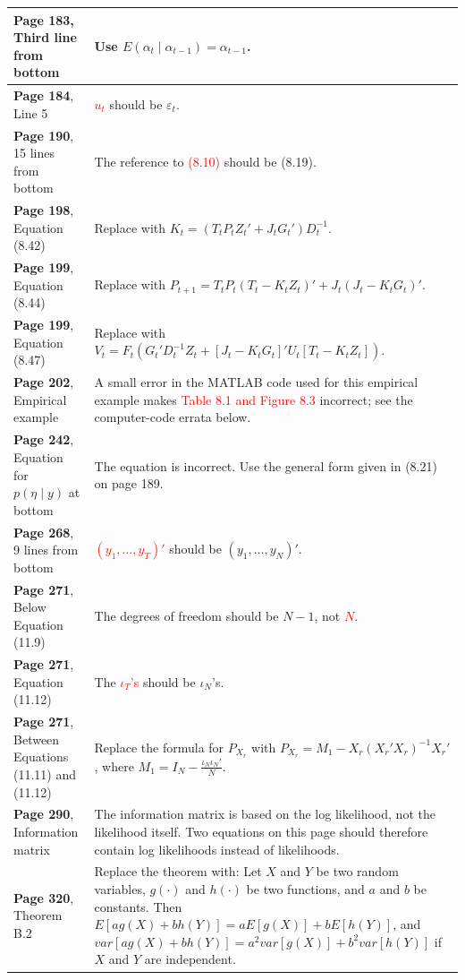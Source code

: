 \documentclass[10pt, a4paper]{article}
\newcommand{\red}[1]{\textcolor{red}{#1}}
\newcommand{\green}[1]{\textcolor{green!50!black}{#1}}
\begin{document}
\begin{longtable}{|R{.36\textwidth}|R{.58\textwidth}|}
	\textbf{Page 183}, Third line from bottom & Use \green{$E(\alpha_t\mid\alpha_{t-1})=\alpha_{t-1}$}. \\ \hline	
	\textbf{Page 184}, Line 5 & \red{$u_t$} should be \green{$\varepsilon_t$}. \\ \hline	
	\textbf{Page 190}, 15 lines from bottom & The reference to \red{(8.10)} should be \green{(8.19)}. \\ \hline	
	\textbf{Page 198}, Equation (8.42) & Replace with \green{$\displaystyle K_t=(T_tP_tZ_t'+J_tG_t')D_t^{-1}$}. \\ \hline	
	\textbf{Page 199}, Equation (8.44) & Replace with \green{$\displaystyle P_{t+1}=T_tP_t(T_t-K_tZ_t)'+J_t(J_t-K_tG_t)'$}. \\ \hline	
	\textbf{Page 199}, Equation (8.47) & Replace with \green{$\displaystyle V_t=F_t\left(G_t'D_t^{-1}Z_t+[J_t-K_tG_t]'U_t[T_t-K_tZ_t]\right)$}. \\ \hline	
	\textbf{Page 202}, Empirical example & A small error in the MATLAB code used for this empirical example makes \red{Table 8.1 and Figure 8.3} incorrect; see the computer-code errata below. \\ \hline	
	\textbf{Page 242}, Equation for $p(\eta\mid y)$ at bottom & The equation is incorrect. Use the general form given in \green{(8.21) on page 189}. \\ \hline	
	\textbf{Page 268}, 9 lines from bottom & \red{$(y_1,\ldots,y_T)'$} should be \green{$(y_1,\ldots,y_N)'$}. \\ \hline	
	\textbf{Page 271}, Below Equation (11.9) & The degrees of freedom should be \green{$N-1$}, not \red{$N$}. \\ \hline	
	\textbf{Page 271}, Equation (11.12) & The \red{$\iota_T$'s} should be \green{$\iota_N$'s}. \\ \hline	
	\textbf{Page 271}, Between Equations (11.11) and (11.12) & Replace the formula for $P_{X_r}$ with
	\green{$\displaystyle P_{X_r}=M_1-X_r(X_r'X_r)^{-1}X_r'$}, where \green{$\displaystyle M_1=I_N-\frac{\iota_N\iota_N'}{N}$}. \\ \hline	
	\textbf{Page 290}, Information matrix & The information matrix is based on the \green{log likelihood}, not the likelihood itself. Two equations on this page should therefore contain log likelihoods instead of likelihoods. \\ \hline	
	\textbf{Page 320}, Theorem B.2 & Replace the theorem with: \green{Let $X$ and $Y$ be two random variables, $g(\cdot)$ and $h(\cdot)$ be two functions, and $a$ and $b$ be constants. Then $E[ag(X)+bh(Y)]=aE[g(X)]+bE[h(Y)]$, and $var[ag(X)+bh(Y)]=a^2 var[g(X)]+b^2 var[h(Y)]$ if $X$ and $Y$ are independent.} \\ \hline	

\end{longtable}
\end{document}
